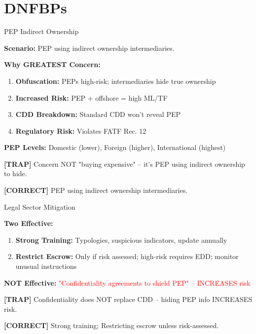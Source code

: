 \documentclass[8pt,aspectratio=169,fontsize=7pt]{beamer}
\renewcommand{\tiny}{\fontsize{4pt}{5pt}\selectfont}
\renewcommand{\normalsize}{\fontsize{8pt}{9pt}\selectfont}
\newcommand{\trap}[1]{%
	\begin{block}{\textcolor{redtrap}{\textbf{[TRAP]}}}
		\textcolor{redtrap}{\tiny #1}
	\end{block}
}
\newcommand{\correct}[1]{%
	\begin{block}{\textcolor{greencorrect}{\textbf{[CORRECT]}}}
		\textcolor{greencorrect}{\tiny #1}
	\end{block}
}
\begin{document}
	\section{DNFBPs}
	
	\begin{frame}{\normalsize PEP Indirect Ownership}
		
		\textbf{Scenario:} PEP using indirect ownership intermediaries.
		
		\textbf{Why GREATEST Concern:}
		\begin{enumerate}
			\item \textbf{Obfuscation:} PEPs high-risk; intermediaries hide true ownership
			\item \textbf{Increased Risk:} PEP + offshore = high ML/TF
			\item \textbf{CDD Breakdown:} Standard CDD won't reveal PEP
			\item \textbf{Regulatory Risk:} Violates FATF Rec. 12
		\end{enumerate}
		
		\textbf{PEP Levels:} Domestic (lower), Foreign (higher), International (highest)
		
		\trap{Concern NOT "buying expensive" -- it's PEP using indirect ownership to hide.}
		
		\correct{PEP using indirect ownership intermediaries.}
	\end{frame}
	
	\begin{frame}{\normalsize Legal Sector Mitigation}
		
		\textbf{Two Effective:}
		\begin{enumerate}
			\item \textbf{Strong Training:} Typologies, suspicious indicators, update annually
			\item \textbf{Restrict Escrow:} Only if risk assessed; high-risk requires EDD; monitor unusual instructions
		\end{enumerate}
		
		\textbf{NOT Effective:} \textcolor{red}{"Confidentiality agreements to shield PEP" -- INCREASES risk}
		
		\trap{Confidentiality does NOT replace CDD -- hiding PEP info INCREASES risk.}
		
		\correct{Strong training; Restricting escrow unless risk-assessed.}
	\end{frame}
	
\end{document}
